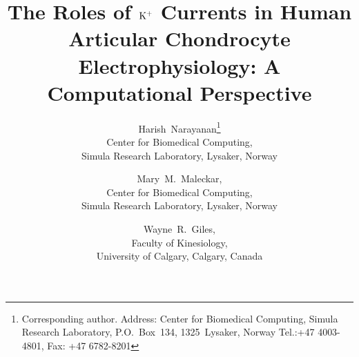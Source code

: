 \newcommand{\todo}[1]{\vspace{5 mm}\par \noindent
  \marginpar{\textsc{ToDo}}
  \framebox{\begin{minipage}[c]{0.95 \textwidth}
      \tt #1 \end{minipage}}\vspace{5 mm}\par}

\newcommand{\todoM}[1]{\vspace{5 mm}\par \noindent
  \marginpar{\textsc{MollySays}}
  \framebox{\begin{minipage}[c]{0.95 \textwidth}
      \tt #1 \end{minipage}}\vspace{5 mm}\par}

\newcommand{\M}[1]{{\bf \textcolor{mollygreen}{#1}}}

\newcommand{\Nao}{$[\rm Na^{+}]_{o}$}
\newcommand{\Ko}{$[\rm K^{+}]_{o}$}
\newcommand{\Cao}{$[\rm Ca^{2+}]_{o}$}
\newcommand{\Ho}{$[\rm H^{+}]_{o}$}
\newcommand{\Clo}{$[\rm Cl^{-}]_{o}$}

\newcommand{\Nai}{$[\rm Na^{+}]_{i}$}
\newcommand{\Ki}{$[\rm K^{+}]_{i}$}
\newcommand{\Cai}{$[\rm Ca^{2+}]_{i}$}
\newcommand{\Hi}{$[\rm H^{+}]_{i}$}
\newcommand{\Cli}{$[\rm Cl^{-}]_{i}$}

\newcommand{\Na}{$\rm Na^{+}$}
\newcommand{\K}{$\rm K^{+}$}
\newcommand{\Ca}{$\rm Ca^{2+}$}
\renewcommand{\H}{$\rm H^{+}$}
\newcommand{\Cl}{$\rm Cl^{-}$}

\title{The Roles of ${\rm K}^{+}$ Currents in Human Articular
  Chondrocyte Electrophysiology: A Computational Perspective}

\author{Harish~Narayanan\thanks{
           Corresponding author. Address:
           Center for Biomedical Computing,
           Simula Research Laboratory,
           P.O.~Box~134,
           1325~Lysaker, Norway
	   Tel.:+47 4003-4801, Fax: +47 6782-8201} \\
         Center for Biomedical Computing, \\
         Simula Research Laboratory, Lysaker, Norway
         \and Mary~M.~Maleckar, \\
         Center for Biomedical Computing, \\
         Simula Research Laboratory, Lysaker, Norway
         \and Wayne~R.~Giles, \\
         Faculty of Kinesiology, \\
         University of Calgary, Calgary, Canada}
